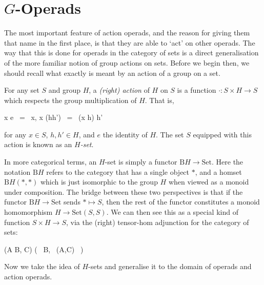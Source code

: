 \section{$G$-Operads}

The most important feature of action operads, and the reason for giving them that name in the first place, is that they are able to `act' on other operads. The way that this is done for operads in the category of sets is a direct generalisation of the more familiar notion of group actions on sets. Before we begin then, we should recall what exactly is meant by an action of a group on a set.

\begin{defn} For any set $S$ and group $H$, a \emph{(right) action} of $H$ on $S$ is a function $\cdot : S \times H \to S$ which respects the group multiplication of $H$. That is,
\begin{eq*} x \cdot e \, = \, x, \quad \quad \quad \quad x \cdot (hh') \, = \, (x \cdot h) \cdot h' \end{eq*}
for any $x \in S$, $h,h' \in H$, and $e$ the identity of $H$. The set $S$ equipped with this action is known as an \emph{$H$-set}.
\end{defn}

In more categorical terms, an $H$-set is simply a functor $\mathrm{B}H \to \mathrm{Set}$. Here the notation $\mathrm{B}H$ refers to the category that has a single object $\ast$, and a homset $\mathrm{B}H(\ast, \ast)$ which is just isomorphic to the group $H$ when viewed as a monoid under composition. The bridge between these two perspectives is that if the functor $\mathrm{B}H \to \mathrm{Set}$ sends $\ast \mapsto S$, then the rest of the functor constitutes a monoid homomorphism $H \to \mathrm{Set}(S, S)$. We can then see this as a special kind of function $S \times H \to S$, via the (right) tensor-hom adjunction for the category of sets:
\begin{eq*} (A \times B, C) \quad \cong \quad {}\big( \, B, \, (A,C) \, \big) \end{eq*}

Now we take the idea of $H$-sets and generalise it to the domain of operads and action operads.

